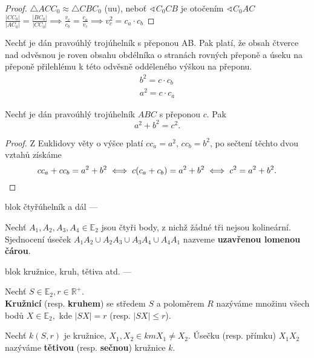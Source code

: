 \begin{proof}
  $\triangle ACC_0 \approx \triangle CBC_0$ (uu), neboť $\sphericalangle C_0 CB$ je otočením $\sphericalangle C_0 AC$
  $\frac{|CC_0|}{|AC_0|} = \frac{|BC_0|}{|CC_0|} \implies \frac{v_c}{c_b} = \frac{c_a}{v_c} \implies v_c^2 = c_a \cdot c_b$
\end{proof}

\begin{veta}
  Nechť je dán pravoúhlý trojúhelník s přeponou AB. Pak platí, že obsah čtverce nad odvěsnou je roven obsahu obdélníka o stranách rovných přeponě a úseku na přeponě přilehlému k této odvěsně odděleného výškou na přeponu.
  \begin{align*}
    b^2 = c \cdot c_b\\
    a^2 = c \cdot c_a
  \end{align*}
\end{veta}

\begin{veta}[Pythagorova]
  Nechť je dán pravoúhlý trojúhelník $ABC$ s přeponou $c$. Pak
  \[
    a^2+b^2 = c^2.
  \]
\end{veta}


\begin{proof}
  Z Euklidovy věty o výšce platí $cc_a=a^2$, $cc_b=b^2$, po sečtení těchto dvou vztahů získáme
  \[
    cc_a+cc_b=a^2+b^2 \iff c(c_a+c_b)=a^2+b^2 \iff c^2=a^2+b^2. \qedhere
  \]
\end{proof}

blok čtyřúhelník a dál ---
\begin{definition}
  Nechť $A_1,A_2, A_3, A_4 \in \mathbb E_2$ jsou čtyři body, z nichž žádné tři nejsou kolineární. Sjednocení úseček $A_1A_2\cup A_2A_3 \cup A_3A_4 \cup A_4A_1$ nazveme \textbf{uzavřenou lomenou čárou}.
\end{definition}

blok kružnice, kruh, tětiva atd. ---
\begin{definition}
  Nechť $S \in \mathbb E_2, r \in \mathbb R^+.$\\
  \textbf{Kružnicí} (resp. \textbf{kruhem}) se středem $S$ a poloměrem $R$ nazýváme množinu všech bodů $X\in \mathbb E_2, $ kde $|SX|=r$ (resp. $|SX|\leq r$).
\end{definition}

\begin{definition}
  Nechť $k(S,r)$ je kružnice, $X_1, X_2 \in km X_1\ne X_2.$ Úsečku (resp. přímku) $X_1X_2$ nazýváme \textbf{tětivou} (resp. \textbf{sečnou}) kružnice $k$.
\end{definition}


